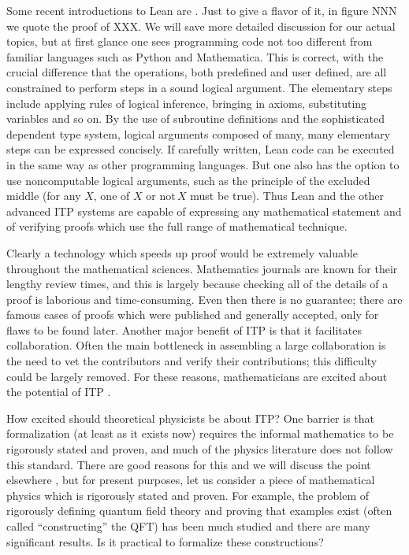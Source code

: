 \documentclass{article}
\newcommand{\1}{\mathbbm{1}}
\theoremstyle{plain}
\theoremstyle{definition}
\numberwithin{equation}{section}
\newcommand{\SH}[2][blue]{\textcolor{#1}{\footnotesize\sf[#2]}}
\begin{document}
Some recent introductions to Lean are \cite{}.  Just to give a flavor of it, in figure NNN we quote the proof of XXX.
We will save more detailed discussion for our actual topics, but at first glance one sees programming code not too different from familiar languages such as Python and Mathematica.  This is correct, with the crucial difference that the operations, both predefined and user defined, are all constrained to perform steps in a sound logical argument.  The elementary steps include applying rules of logical inference, bringing in axioms, substituting variables and so on.  By the use of subroutine definitions and the sophisticated dependent type system,
logical arguments composed of many, many elementary steps can be expressed concisely.  If carefully written,
Lean code can be executed in the same way as other programming languages.  But one also has the option to use
noncomputable logical arguments, such as the principle of the excluded middle (for any $X$, one of $X$ or $\mbox{not}\, X$ 
must be true).  Thus Lean and the other advanced ITP systems are capable of expressing any mathematical statement
and of verifying proofs which use the full range of mathematical technique.

Clearly a technology which speeds up proof would be extremely valuable throughout the mathematical sciences.  Mathematics journals are known for their lengthy review times, and this is largely because checking all of the details of a proof is laborious and time-consuming.  Even then there is no guarantee; there are famous cases of proofs which were published and generally accepted, only for flaws to be found later.  Another major benefit of ITP is that it facilitates collaboration.  Often the main bottleneck in assembling a large collaboration is the need to vet the contributors and verify their contributions; this difficulty could be largely removed.  For these reasons, mathematicians are excited about the potential of ITP \cite{}.
\SH{We can cite the terry tao announcements }

How excited should theoretical physicists be about ITP?  One barrier is that formalization (at least as it exists now) requires the informal mathematics to be rigorously stated and proven, and much of the physics literature does not follow this standard.  There are good reasons for this and we will discuss the point elsewhere \cite{}, but for present purposes, let us consider a piece of mathematical physics which is rigorously stated and proven.  For example, the problem of rigorously defining quantum field theory and proving that examples exist (often called ``constructing'' the QFT) has been much studied and there are many significant results.  Is it practical to formalize these constructions?
\end{document}
